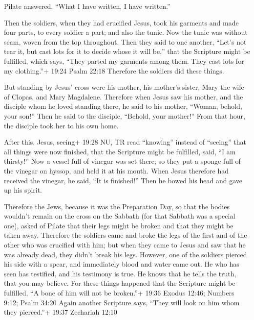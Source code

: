  Pilate answered, ``What I have written, I have written.''

 Then the soldiers, when they had crucified Jesus, took his
garments and made four parts, to every soldier a part; and also the
tunic. Now the tunic was without seam, woven from the top throughout.
 Then they said to one another, ``Let's not tear it, but
cast lots for it to decide whose it will be,'' that the Scripture might
be fulfilled, which says, ``They parted my garments among them. They
cast lots for my clothing.''+ 19:24 Psalm 22:18 Therefore the soldiers
did these things.

 But standing by Jesus' cross were his mother, his mother's
sister, Mary the wife of Clopas, and Mary Magdalene. 
Therefore when Jesus saw his mother, and the disciple whom he loved
standing there, he said to his mother, ``Woman, behold, your son!''
 Then he said to the disciple, ``Behold, your mother!''
From that hour, the disciple took her to his own home.

 After this, Jesus, seeing+ 19:28 NU, TR read ``knowing''
instead of ``seeing'' that all things were now finished, that the
Scripture might be fulfilled, said, ``I am thirsty!''  Now
a vessel full of vinegar was set there; so they put a sponge full of the
vinegar on hyssop, and held it at his mouth.  When Jesus
therefore had received the vinegar, he said, ``It is finished!'' Then he
bowed his head and gave up his spirit.

 Therefore the Jews, because it was the Preparation Day, so
that the bodies wouldn't remain on the cross on the Sabbath (for that
Sabbath was a special one), asked of Pilate that their legs might be
broken and that they might be taken away.  Therefore the
soldiers came and broke the legs of the first and of the other who was
crucified with him;  but when they came to Jesus and saw
that he was already dead, they didn't break his legs. 
However, one of the soldiers pierced his side with a spear, and
immediately blood and water came out.  He who has seen has
testified, and his testimony is true. He knows that he tells the truth,
that you may believe.  For these things happened that the
Scripture might be fulfilled, ``A bone of him will not be broken.''+
19:36 Exodus 12:46; Numbers 9:12; Psalm 34:20  Again
another Scripture says, ``They will look on him whom they pierced.''+
19:37 Zechariah 12:10

